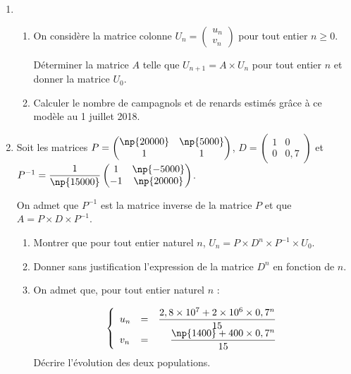 \documentclass[10pt]{article}
\begin{document}
\begin{enumerate}
\item 
	\begin{enumerate}
		\item On considère la matrice colonne $U_n = \begin{pmatrix}u_n\\v_n\end{pmatrix}$ pour tout entier $n \geqslant 0$.
		
Déterminer la matrice $A$ telle que $U_{n+1} = A \times U_n$ pour tout entier $n$ et donner la matrice $U_0$.
		\item Calculer le nombre de campagnols et de renards estimés grâce à ce modèle au 1 juillet
2018.
	\end{enumerate}
\item Soit les matrices $P = \begin{pmatrix}\np{20000}&\np{5000}\\1&1\end{pmatrix}$, \:$D = \begin{pmatrix}1&0\\0&0,7\end{pmatrix}$ et $P^{-1} = \dfrac{1}{\np{15000}}\begin{pmatrix}1& \np{-5000}\\- 1&\np{20000}\end{pmatrix}$.
	
On admet que $P^{- 1}$ est la matrice inverse de la matrice $P$ et que $A = P \times D \times P^{- 1}$.
	\begin{enumerate}
		\item Montrer que pour tout entier naturel $n$,\: $U_n = P \times D^n \times P^{- 1} \times U_0$.
		\item Donner sans justification l'expression de la matrice $D^n$ en fonction de $n$.
		\item On admet que, pour tout entier naturel $n$ :
	
\renewcommand\arraystretch{1.8}	
\[\left\{\begin{array}{l c r}
u_n &=& \dfrac{2,8 \times 10^7 + 2 \times 10^6 \times 0,7^n}{15}\\

v_n &=&\dfrac{\np{1400} + 400 \times 0,7^n}{15}
		\end{array}\right.\]
\renewcommand\arraystretch{1}	
Décrire l'évolution des deux populations.
	\end{enumerate}
\end{enumerate}
\end{document}
